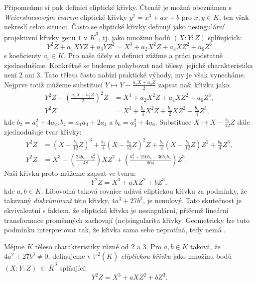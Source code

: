 \documentclass[12pt]{report}
\begin{document}
Připomeňme si pak definici eliptické křivky. Čtenář je možná obeznámen s \textit{Weierstrassovým tvarem} eliptické křivky $y^2 = x^3+ax+b$ pro $x,y \in K$, ten však nekreslí celou situaci. Často se eliptické křivky definují jako nesingulární projektivní křivky genu $1$ v $\overline{K}^3$, tj. jako množinu bodů $(X:Y:Z)$ splňujících:
\begin{equation*}
Y^2 Z + a_1 XYZ + a_3 Y Z^2 = X^3 + a_2 X^2 Z + a_4 X Z^2 + a_6 Z^3
\end{equation*}
s koeficienty $a_i \in K$. Pro naše účely si definici zúžíme a práci podstatně zjednodušíme. Konkrétně se budeme pohybovat nad tělesy, jejichž charakteristika není $2$ ani $3$. Tato tělesa často nabízí praktické výhody, my je však vynecháme. Nejprve totiž můžeme substitucí $Y \mapsto Y - \frac{a_1 X +a_3 Z}{2}$ zapsat naši křivku jako:
\begin{align*}
Y^2 Z -  \left(\frac{a_1 X + a_3 Z}{2}\right)^2 Z &=  X^3 + a_2 X^2 Z + a_4 X Z^2 + a_6 Z^3,\\
Y^2 Z &= X^3 + \frac{b_2}{4} X^2 Z + \frac{b_4}{2} X Z^2 + \frac{b_6}{4} Z^3,
\end{align*}
kde $b_2 = a_1 ^2 + 4 a_2, b_4 = a_1 a_3 + 2 a_4$ a $b_6 = a_3^2 + 4 a_6$. Substituce $X \mapsto X - \frac{b_2}{12} Z$ dále zjednodušuje tvar křivky:
\begin{align*}
Y^2 Z &= \left( X - \frac{b_2}{12} Z\right)^3 + \frac{b_2}{4} \left( X - \frac{b_2}{12} Z\right)^2 Z + \frac{b_4}{2} \left( X - \frac{b_2}{12} Z\right) Z^2 + \frac{b_6}{4} Z^3,\\
Y^2 Z &= X^3 + \left( \frac{24 b_4 - b_2 ^2}{48} \right) X Z^2 + \left( \frac{b_2 ^2 + 216 b_6 - 36 b_2 b_4}{864} \right) Z^3.
\end{align*}
Naši křivku proto můžeme zapsat ve tvaru:
\begin{equation*}
Y^2 Z = X^3 +a X Z^2 + b Z^3,
\end{equation*}
kde $a,b \in K$. Libovolná taková rovnice udává eliptickou křivku za podmínky, že takzvaný \textit{diskriminant} této křivky, $4a^3 + 27 b^2$, je nenulový. Tato skutečnost je ekvivalentní s faktem, že eliptická křivka je nesingulární, přičemž lineární transformace proměnných zachovají (ne)singularitu křivky. Geometricky lze tuto podmínku interpretovat tak, že křivka sama sebe neprotíná, tedy nemá .

\begin{definice}
Mějme $K$ těleso charakteristiky různé od $2$ a $3$. Pro $a,b \in K$ taková, že\\ $4a^2+27b^3 \neq 0$, definujeme v $\mathbb{P}^2 (\overline{K})$ \textit{eliptickou křivku} jako množinu bodů $(X:Y:Z)~\in~\overline{K}^3$ splňující:
\begin{equation*}
Y^2 Z = X^3 + a X Z^2 + b Z^3. 
\end{equation*}
\end{definice}
\end{document}
